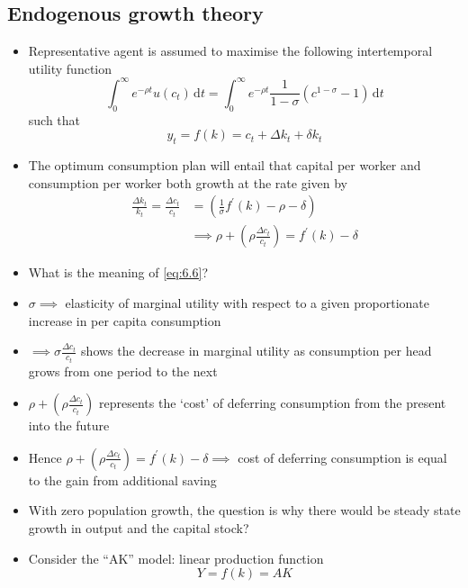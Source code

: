 \documentclass[a4paper,twoside]{article}
\numberwithin{equation}{section}
\numberwithin{figure}{section}
\begin{document}
\subsection{Endogenous growth theory}
\begin{itemize}
	\item Representative agent is assumed to maximise the following intertemporal utility function
	\begin{equation}
		\int_{0}^{\infty} e^{-\rho t} u(c_t) \,\mathrm{d}t = \int_{0}^{\infty} e^{-\rho t} \frac{1}{1-\sigma}(c^{1-\sigma} - 1) \,\mathrm{d}t
	\end{equation}
	such that
	\begin{equation}
		y_t = f(k) = c_t + \Delta k_t + \delta k_t
	\end{equation}
	\item The optimum consumption plan will entail that capital per worker and consumption per worker both growth at the rate given by 
	\begin{align}
		\frac{\Delta k_t}{k_t} = \frac{\Delta c_t}{c_t} &= (\frac{1}{\sigma}f^\prime(k) -\rho - \delta) \label{eq:6.5}\\
		&\implies \rho + \left( \rho \frac{\Delta c_t}{c_t} \right) = f^\prime(k) -\delta \label{eq:6.6}
	\end{align}
	\item What is the meaning of \cref{eq:6.6}?
	\item \( \sigma \implies \) elasticity of marginal utility with respect to a given proportionate increase in per capita consumption
	\item \( \implies \sigma \frac{\Delta c_t}{c_t} \) shows the decrease in marginal utility as consumption per head grows from one period to the next
	\item \( \rho + \left( \rho \frac{\Delta c_t}{c_t} \right) \) represents the `cost' of deferring consumption from the present into the future
	\item Hence \( \rho + \left( \rho \frac{\Delta c_t}{c_t} \right) = f^\prime(k) -\delta \implies \) cost of deferring consumption is equal to the gain from additional saving
	\item  With zero population growth, the question is why there would be steady state growth in output and the capital stock?
	\item Consider the ``AK'' model: linear production function
	\begin{equation}
		Y = f(k) = AK \label{eq:6.7}
	\end{equation}

\end{itemize}
\end{document}
